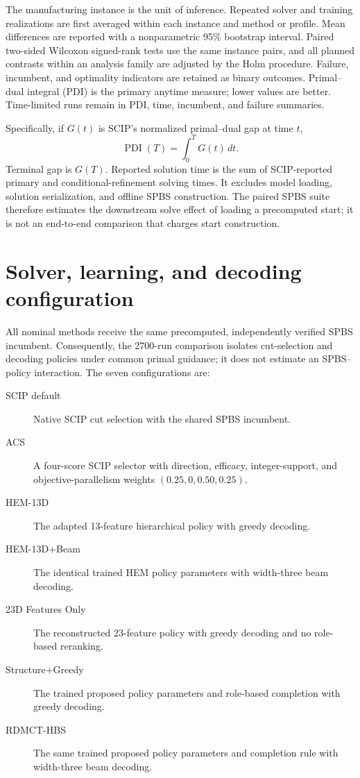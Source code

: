 \documentclass[11pt]{article}
\begin{document}
The manufacturing instance is the unit of inference. Repeated solver and
training realizations are first averaged within each instance and method or
profile. Mean differences are reported with a nonparametric 95\% bootstrap
interval. Paired two-sided Wilcoxon signed-rank tests use the same instance
pairs, and all planned contrasts within an analysis family are adjusted by
the Holm procedure. Failure, incumbent, and optimality indicators are retained
as binary outcomes. Primal--dual integral (PDI) is the primary anytime measure;
lower values are better. Time-limited runs remain in PDI, time, incumbent, and
failure summaries.

Specifically, if $G(t)$ is SCIP's normalized primal--dual gap at time $t$,
\begin{equation}
\operatorname{PDI}(T)=\int_0^T G(t)\,dt .
\end{equation}
Terminal gap is $G(T)$. Reported solution time is the sum of SCIP-reported
primary and conditional-refinement solving times. It excludes model loading,
solution serialization, and offline SPBS construction. The paired SPBS suite
therefore estimates the downstream solve effect of loading a precomputed
start; it is not an end-to-end comparison that charges start construction.

\section{Solver, learning, and decoding configuration}

All nominal methods receive the same precomputed, independently verified SPBS
incumbent. Consequently, the 2700-run comparison isolates cut-selection and
decoding policies under common primal guidance; it does not estimate an
SPBS--policy interaction. The seven configurations are:
\begin{description}
\item[SCIP default] Native SCIP cut selection with the shared SPBS incumbent.
\item[ACS] A four-score SCIP selector with direction, efficacy, integer-support,
and objective-parallelism weights $(0.25,0,0.50,0.25)$.
\item[HEM-13D] The adapted 13-feature hierarchical policy with greedy decoding.
\item[HEM-13D+Beam] The identical trained HEM policy parameters with width-three beam decoding.
\item[23D Features Only] The reconstructed 23-feature policy with greedy
decoding and no role-based reranking.
\item[Structure+Greedy] The trained proposed policy parameters and role-based completion with
greedy decoding.
\item[RDMCT-HBS] The same trained proposed policy parameters and completion rule with
width-three beam decoding.
\end{description}
\end{document}

